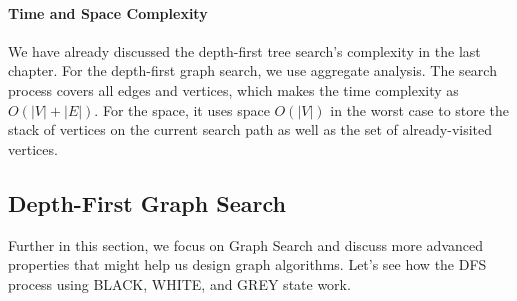 \documentclass[main.tex]{subfiles}
\begin{document}
\paragraph{Time and Space Complexity} We have already discussed the depth-first tree search's complexity in the last chapter.  For the depth-first graph search, we use aggregate analysis. The search process covers all edges and vertices, which makes the time complexity as $O(|V|+|E|)$. For the space, it uses space $O(|V|)$ in the worst case to
store the stack of vertices on the current search path as well as the set of
already-visited vertices.

\subsection{Depth-First Graph Search}
Further in this section, we focus  on Graph Search and discuss more advanced properties that might help us design graph algorithms. Let's see how the DFS process using BLACK, WHITE, and GREY state work. 
\end{document}
